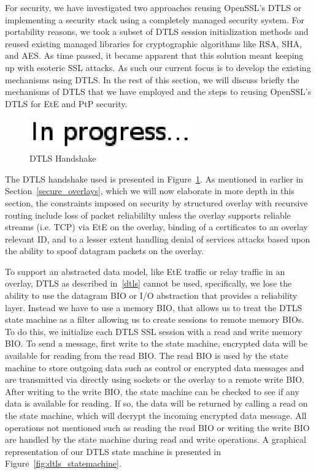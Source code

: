 \documentclass[conference]{IEEEtran}
\begin{document}
For security, we have investigated two approaches reusing OpenSSL's DTLS or
implementing a security stack using a completely managed security system.
For portability reasons, we took a subset of DTLS session initialization
methods and reused existing managed libraries for cryptographic algorithms like
RSA, SHA, and AES.  As time passed, it became apparent that this solution meant
keeping up with esoteric SSL attacks.  As such our current focus is to develop
the existing mechanisms using DTLS.  In the rest of this section, we will
discuss briefly the mechanisms of DTLS that we have employed and the steps to
reusing OpenSSL's DTLS for EtE and PtP security.

\begin{figure}[h]
\centering
\includegraphics[width=2.75in]{in_progress.eps}
\caption{DTLS Handshake}
\label{fig:dtls}
\end{figure}

The DTLS handshake used is presented in Figure~\ref{fig:dtls}.  As mentioned in
earlier in Section~\ref{secure_overlays}, which we will now elaborate in more
depth in this section, the constraints imposed on security by structured overlay
with recursive routing include loss of packet reliabililty unless the overlay
supports reliable streams (i.e. TCP) via EtE on the overlay, binding of a
certificates to an overlay relevant ID, and to a lesser extent handling denial
of services attacks based upon the ability to spoof datagram packets on the
overlay.

To support an abstracted data model, like EtE traffic or relay traffic in an
overlay, DTLS as described in~\ref{dtls} cannot be used, specifically, we lose
the ability to use the datagram BIO or I/O abstraction that provides a
reliability layer.  Instead we have to use a memory BIO, that allows us to
treat the DTLS state machine as a filter allowing us to create sessions to
remote memory BIOs.  To do this, we initialize each DTLS SSL session with a
read and write memory BIO.  To send a message, first write to the state machine,
encrypted data will be available for reading from the read BIO.  The read BIO
is used by the state machine to store outgoing data such as control or encrypted
data messages and are transmitted via directly using sockets or the overlay to
a remote write BIO.  After writing to the write BIO, the state machine can be
checked to see if any data is available for reading.  If so, the data will be
returned by calling a read on the state machine, which will decrypt the
incoming encrypted data message.  All operations not mentioned such as reading
the read BIO or writing the write BIO are handled by the state machine during
read and write operations.  A graphical representation of our DTLS state machine
is presented in Figure~\ref{fig:dtls_statemachine}.
\end{document}

